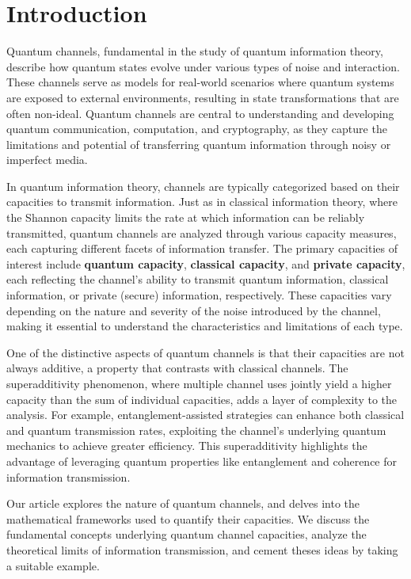 \section{Introduction}

Quantum channels, fundamental in the study of quantum information theory,
describe how quantum states evolve under various types of noise and interaction.
These channels serve as models for real-world scenarios where quantum systems
are exposed to external environments, resulting in state transformations that
are often non-ideal. Quantum channels are central to understanding and developing
quantum communication, computation, and cryptography, as they capture the
limitations and potential of transferring quantum information through noisy or
imperfect media.

In quantum information theory, channels are typically categorized based on their
capacities to transmit information. Just as in classical information theory, where
the Shannon capacity limits the rate at which information can be reliably transmitted,
quantum channels are analyzed through various capacity measures, each capturing
different facets of information transfer. The primary capacities of interest include
\textbf{quantum capacity}, \textbf{classical capacity}, and \textbf{private capacity},
each reflecting the channel's ability to transmit quantum information, classical
information, or private (secure) information, respectively. These capacities vary
depending on the nature and severity of the noise introduced by the channel, making
it essential to understand the characteristics and limitations of each type.

One of the distinctive aspects of quantum channels is that their capacities are not
always additive, a property that contrasts with classical channels. The superadditivity
phenomenon, where multiple channel uses jointly yield a higher capacity than the sum of
individual capacities, adds a layer of complexity to the analysis. For example,
entanglement-assisted strategies can enhance both classical and quantum transmission rates,
exploiting the channel's underlying quantum mechanics to achieve greater efficiency. This
superadditivity highlights the advantage of leveraging quantum properties like entanglement
and coherence for information transmission.

Our article explores the nature of quantum channels, and delves into the mathematical
frameworks used to quantify their capacities. We discuss the fundamental concepts underlying
quantum channel capacities, analyze the theoretical limits of information transmission, and
cement theses ideas by taking a suitable example.

